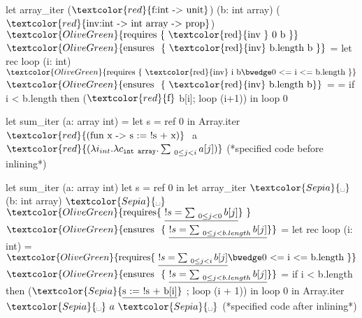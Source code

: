 	
		\begin{adjustwidth}{-4em}{-2em}
\begin{footnotesize}
\begin{minipage}[t]{0.3\linewidth}
\begin{whycode}  
   let array_iter ($\textcolor{red}{\text{f:int -> unit}}$) (b: int array) 
                  ($\textcolor{red}{\text{inv:int -> int array -> prop}}$)    
     $\textcolor{OliveGreen}{\text{requires \{ \textcolor{red}{\text{inv }} 0~b \}}}$
     $\textcolor{OliveGreen}{\text{ensures~~}\{ \text{ \textcolor{red}{inv} b.length~b }\}}$  
   = let rec loop (i: int)
       $\textcolor{OliveGreen}{ \text{requires \{~\textcolor{red}{inv} i b} \bwedge \text{0 <= i <= b.length}~\}}$
       $\textcolor{OliveGreen}{\text{ensures~~}\{ \text{ \textcolor{red}{inv} b.length~b}\}}$ =    
       = if i < b.length then ($\textcolor{red}{\text{f}}$ b[i]; loop (i+1)) 
     in loop 0
   
   let sum_iter (a: array int) =		 
     let s = ref 0 in 
     Array.iter $\textcolor{red}{\text{(fun x -> s := !s + x)}}~$ a
                $\textcolor{red}{(\lambda i_{int}.\lambda c_{\texttt{int array}}. \sum_{~0\leq j < i} a[j])}$                                  
           (*specified code before inlining*)
\end{whycode}
\end{minipage}\hfill\vline
\begin{minipage}[t]{0.48\linewidth}
	\begin{whycode}  
   let sum_iter (a: array int)		
     let s = ref 0 in
     let array_iter $\textcolor{Sepia}{\text{\textvisiblespace}}$ (b: int array) $\textcolor{Sepia}{\text{\textvisiblespace}}$
     $\textcolor{OliveGreen}{\text{requires} \{~\underline{!s = \sum_{~0\leq j < 0} b[j]}}~\}$      
     $\textcolor{OliveGreen}{\text{ensures~~}\{~\underline{!s = \sum_{~0\leq j < b.length} b[j]}\}}$    
     = let rec loop (i: int) = 
         $\textcolor{OliveGreen}{ \text{requires} \{~\underline{!s = \sum_{~0\leq j < i} b[j] } \bwedge \text{0 <= i <= b.length}~\}}$
         $\textcolor{OliveGreen}{\text{ensures~~}\{~\underline{!s = \sum_{~0\leq j < b.length} b[j]}\}}$   
         = if i < b.length then  
         ($\textcolor{Sepia}{\text{\underline{s := !s + b[i]}}}$ ; 
          loop (i + 1)) 
       in loop 0   
     in Array.iter $\textcolor{Sepia}{\text{\textvisiblespace}}~a~\textcolor{Sepia}{\text{\textvisiblespace}}$   
               (*specified code after inlining*)
 	\end{whycode}
 	\end{minipage}
 \end{footnotesize}
\end{adjustwidth}

